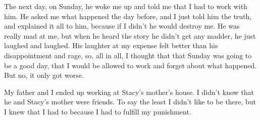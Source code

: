 The next day, on Sunday, he woke me up and told me that I had to work with him. He asked me what happened the day before, and I just told him the truth, and explained it all to him, because if I didn’t he would destroy me. He was really mad at me, but when he heard the story he didn’t get any madder, he just laughed and laughed. His laughter at my expense felt better than his disappointment and rage, so, all in all, I thought that that Sunday was going to be a good day, that I would be allowed to work and forget about what happened. But no, it only got worse.

My father and I ended up working at Stacy’s mother’s house. I didn’t know that he and Stacy’s mother were friends. To say the least I didn’t like to be there, but I knew that I had to because I had to fulfill my punishment.
